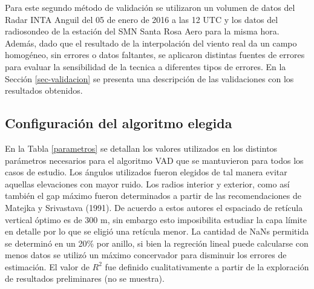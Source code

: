 \documentclass[12pt,spanish,oneside, a4paper]{book}
\begin{document}
Para este segundo método de validación se utilizaron un volumen de datos
del Radar INTA Anguil del 05 de enero de 2016 a las 12 UTC y los datos
del radiosondeo de la estación del SMN Santa Rosa Aero para la misma
hora. Además, dado que el resultado de la interpolación del viento real
da un campo homogéneo, sin errores o datos faltantes, se aplicaron
distintas fuentes de errores para evaluar la sensibilidad de la tecnica
a diferentes tipos de errores. En la Sección \ref{sec-validacion} se
presenta una descripción de las validaciones con los resultados
obtenidos.

\subsection{Configuración del algoritmo
elegida}\label{configuracion-del-algoritmo-elegida}

En la Tabla \ref{parametros} se detallan los valores utilizados en los
distintos parámetros necesarios para el algoritmo VAD que se mantuvieron
para todos los casos de estudio. Los ángulos utilizados fueron elegidos
de tal manera evitar aquellas elevaciones con mayor ruido. Los radios
interior y exterior, como así también el gap máximo fueron determinados
a partir de las recomendaciones de Matejka y Srivastava (1991). De
acuerdo a estos autores el espaciado de retícula vertical óptimo es de
300 m, sin embargo esto imposibilita estudiar la capa límite en detalle
por lo que se eligió una retícula menor. La cantidad de NaNs permitida
se determinó en un 20\% por anillo, si bien la regreción lineal puede
calcularse con menos datos se utilizó un máximo concervador para
disminuir los errores de estimación. El valor de \(R^2\) fue definido
cualitativamente a partir de la exploración de resultados preliminares
(no se muestra).
\end{document}
